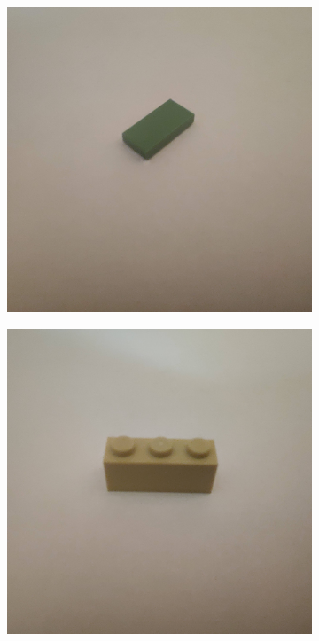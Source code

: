 \documentclass[]{article}
\begin{document}
\begin{figure}[h]
\begin{subfigure}[b]{0.2\textwidth}
    \end{subfigure}
    \begin{subfigure}[b]{0.2\textwidth}
        \includegraphics[width=\textwidth]{photographed images/19.jpg}
    \end{subfigure}
    \begin{subfigure}[b]{0.2\textwidth}
        \includegraphics[width=\textwidth]{photographed images/20.jpg}

\end{subfigure}
\end{figure}
\end{document}
